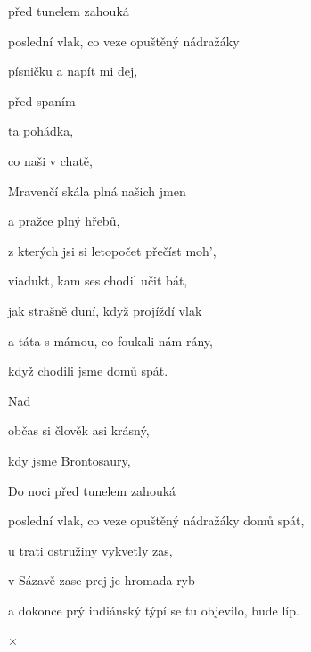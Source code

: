 

\zs
{} před tunelem zahouká

poslední vlak, co veze opuštěný nádražáky 

 písničku a napít mi dej,

před spaním    

ta  pohádka,

co  naši v chatě, 
\ks

\zs
Mravenčí skála plná našich jmen

a pražce plný hřebů,

z kterých jsi si letopočet přečíst moh',

viadukt, kam ses chodil učit bát,

jak strašně duní, když projíždí vlak

a táta s mámou, co foukali nám rány,

když chodili jsme domů spát.
\ks

\zr
Nad  

občas  si člověk asi  krásný,

kdy  jsme Brontosaury, 
\kr

\zs
Do noci před tunelem zahouká

poslední vlak, co veze opuštěný nádražáky domů spát,

u trati ostružiny vykvetly zas,

v Sázavě zase prej je hromada ryb

a dokonce prý indiánský týpí se tu objevilo, bude líp.
\ks

× \kr

\kp
